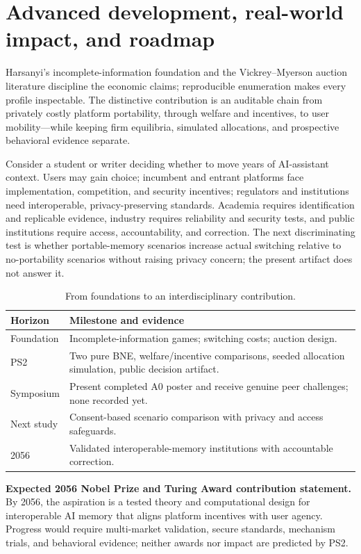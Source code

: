 \section{Advanced development, real-world impact, and roadmap}
Harsanyi's incomplete-information foundation and the Vickrey--Myerson auction literature discipline the economic claims; reproducible enumeration makes every profile inspectable. The distinctive contribution is an auditable chain from privately costly platform portability, through welfare and incentives, to user mobility---while keeping firm equilibria, simulated allocations, and prospective behavioral evidence separate.

Consider a student or writer deciding whether to move years of AI-assistant context. Users may gain choice; incumbent and entrant platforms face implementation, competition, and security incentives; regulators and institutions need interoperable, privacy-preserving standards. Academia requires identification and replicable evidence, industry requires reliability and security tests, and public institutions require access, accountability, and correction. The next discriminating test is whether portable-memory scenarios increase actual switching relative to no-portability scenarios without raising privacy concern; the present artifact does not answer it.

\begin{table}[h]\caption{From foundations to an interdisciplinary contribution.}\small
\begin{tabularx}{\columnwidth}{@{}p{1.35cm}Y@{}}\toprule
\textbf{Horizon}&\textbf{Milestone and evidence}\\\midrule
Foundation&Incomplete-information games; switching costs; auction design.\\
PS2&Two pure BNE, welfare/incentive comparisons, seeded allocation simulation, public decision artifact.\\
Symposium&Present completed A0 poster and receive genuine peer challenges; none recorded yet.\\
Next study&Consent-based scenario comparison with privacy and access safeguards.\\
2056&Validated interoperable-memory institutions with accountable correction.\\\bottomrule
\end{tabularx}\end{table}

\noindent\textbf{Expected 2056 Nobel Prize and Turing Award contribution statement.}
By 2056, the aspiration is a tested theory and computational design for interoperable AI memory that aligns platform incentives with user agency. Progress would require multi-market validation, secure standards, mechanism trials, and behavioral evidence; neither awards nor impact are predicted by PS2.

